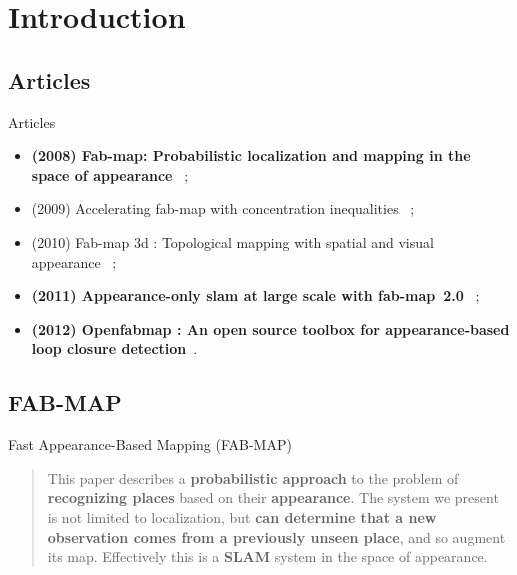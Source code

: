 \section{Introduction}


\subsection{Articles}
\begin{frame}{Articles}
    \leftmargini=0pt
    \begin{itemize}
        \item \textbf{(2008) Fab-map: Probabilistic localization and mapping in the space of appearance}~\cite{fabmap2008b} ;
        \item (2009) Accelerating fab-map with concentration inequalities~\cite{accelerating} ;
        \item (2010) Fab-map 3d : Topological mapping with spatial and visual appearance~\cite{fabmap3d} ;
        \item \textbf{(2011) Appearance-only slam at large scale with fab-map~2.0}~\cite{fabmap2011} ;
        \item \textbf{(2012) Openfabmap : An open source toolbox for appearance-based loop closure detection}~\cite{openfabmap}.
    \end{itemize}
\end{frame}

\subsection{FAB-MAP}
\begin{frame}{Fast Appearance-Based Mapping (FAB-MAP)}
    \begin{quotation}
        This paper describes a \textbf{probabilistic approach} to the problem of \textbf{recognizing places} based on their \textbf{appearance}. The system we present is not limited to localization, but \textbf{can determine that a new observation comes from a previously unseen place}, and so augment its map. Effectively this is a \textbf{SLAM} system in the space of appearance.~\cite{fabmap2008b}
    \end{quotation}
\end{frame}

